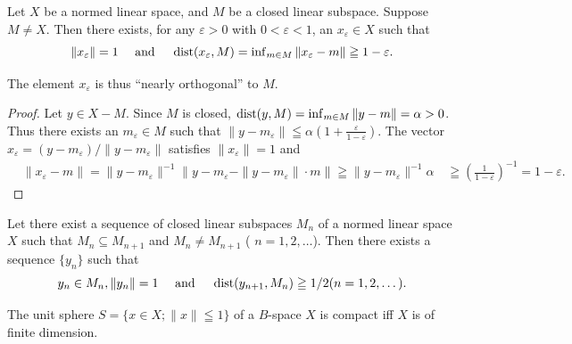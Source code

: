 \begin{theoremn} Let $X$ be a normed linear space, and $M$ be a closed linear subspace. Suppose $M \neq X$. Then there exists, for any $\varepsilon > 0$ with $0 < \varepsilon < 1$, an $x_{\varepsilon} \in X$ such that
\begin{equation}\label{eq:III.2.1}
\left\| x _{\varepsilon} \right\| = 1 \quad \text{ and } \quad \operatorname{dist} (x _{\varepsilon}, M) = \inf\nolimits _{m \in M} \left\| x _{\varepsilon} - m \right\| \geqq 1 - \varepsilon .
\end{equation}

The element $x_{\varepsilon}$ is thus ``nearly orthogonal'' to $M$. 

\end{theoremn}
\begin{proof}
 Let $y \in X - M$. Since $M$ is closed, $\operatorname{dist}(y, M) = \inf\nolimits_{m \in M} \| y - m \| = \alpha > 0$. Thus there exists an $m_{\varepsilon} \in M$ such that $\| y - m_{\varepsilon} \| \leqq \alpha \left(1 + \frac{\varepsilon}{1 - \varepsilon}\right)$. The vector $x_{\varepsilon} = (y - m_{\varepsilon}) / \| y - m_{\varepsilon} \|$ satisfies $\| x_{\varepsilon} \| = 1$ and 
\[ \begin{aligned}
&{\| x _{\varepsilon} - m \| = \| y - m _{\varepsilon} \| ^{-1} \| y - m _{\varepsilon} - \| y - m _{\varepsilon} \| \cdot m \| \geqq \| y - m _{\varepsilon} \| ^{-1} \alpha} {\quad \geqq \left(\frac {1}{1 - \varepsilon}\right) ^{-1} = 1 - \varepsilon .}
\end{aligned}
\]
\end{proof}

\begin{corollary}\label{cor:III.2.Corollary.1} Let there exist a sequence of closed linear subspaces $M_{n}$ of a normed linear space $X$ such that $M_{n} \subseteq M_{n+1}$ and $M_{n} \neq M_{n+1}$ ( $n = 1, 2, \ldots$). Then there exists a sequence $\{y_{n}\}$ such that 
\begin{equation}\label{eq:III.2.2}
y _{n} \in M _{n}, \| y _{n} \| = 1 \quad \text{ and } \quad \operatorname{dist} (y _{n+1}, M _{n}) \geqq 1 / 2 (n = 1, 2, \dots).
\end{equation}
\end{corollary}

\begin{corollary}\label{cor:III.2.Corollary.2} The unit sphere $S = \{x \in X; \| x \| \leqq 1\}$ of a $B$-space $X$ is compact iff $X$ is of finite dimension. 
\end{corollary}

